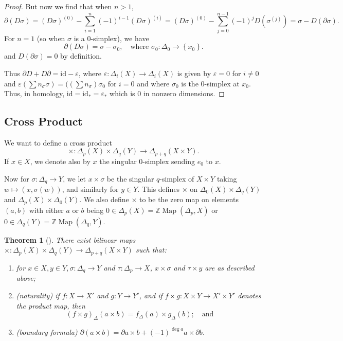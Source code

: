 \documentclass[reqno]{amsart}
\newtheorem{theorem}{Theorem}[section]
\theoremstyle{definition}
\theoremstyle{remark}
\DeclareMathOperator{\Map}{Map}
\newcommand{\id}{{\mathrm{id}}}
\begin{document}
\begin{proof}
    But now we find that when $n>1$,
    \[
    \partial \left( D \sigma \right) =
    \left( D \sigma \right)^{(0)}-
    \sum_{i=1}^{n} (-1)^{i-1} (D\sigma)^{(i)}
    = (D \sigma)^{(0)} - 
    \sum_{j=0}^{n-1} (-1)^{j} D (\sigma^{(j)}) = 
    \sigma - D\left( \partial \sigma \right) .
    \] 
    For $n=1$ (so when $\sigma$ is a $0$-simplex), we have
    \[
    \partial \left( D \sigma \right) =
    \sigma - \sigma_0, \quad \text{where } \sigma_0
    \colon \Delta_0 \to \left\{ x_0 \right\} .
    \] 
    and $D (\partial \sigma) = 0$ by definition.

    Thus $\partial D + D \partial = \id - \varepsilon$, where
    $ \varepsilon  \colon \Delta_i (X) \to 
    \Delta_i (X)$ is given by
    $ \varepsilon = 0$ for
    $i \neq 0$ and
    $\varepsilon \left( \sum n_{\sigma} \sigma \right) =
    (\left( \sum n_{\sigma} \right) \sigma_0$ for
    $i = 0$ and where
    $\sigma_0$ is the $0$-simplex at $x_0$.
    Thus, in homology,
    $\id = \id_* = \varepsilon_*$ which is
    $0$ in nonzero dimensions.
\end{proof}

\subsection{Cross Product}

We want to define a cross product
\[
\times  \colon \Delta_p (X) \times \Delta_q (Y)
\to \Delta_{p+q} (X \times Y).
\] 
If $x \in X$, we denote also by $x$ the singular
$0$-simplex sending $e_0$ to $x$.

Now for $\sigma \colon \Delta_q \to Y$, we let
$x \times \sigma$ be the singular $q$-simplex of
$X \times Y$ taking $w \mapsto (x, \sigma(w))$, and
similarly for $y \in Y$.
This defines $\times $ on 
$\Delta_0 (X) \times \Delta_q(Y)$ and
$\Delta_p(X) \times \Delta_0(Y)$.
We also define
$\times $ to be the zero map on elements
$(a,b)$ with either $a$ or $b$ being $0 \in 
\Delta_p(X) = \mathbb{Z}\Map (\Delta_p, X)$ or
$ 0 \in \Delta_q(Y) = \mathbb{Z}
\Map (\Delta_q, Y)$.

\begin{theorem}[]\label{Thm:LXOAUJC}
    There exist bilinear maps
    $\times  \colon \Delta_p(X) \times \Delta_q (Y)
    \to \Delta_{p+q}(X \times Y)$ such that:
    \begin{enumerate}
        \item for $x \in X, y \in Y, \sigma \colon
            \Delta_q \to Y$ and
            $\tau \colon \Delta_p \to X$,
            $x \times \sigma$ and $\tau \times y$ are as
            described above;
        \item (naturality) if $f \colon X \to X'$ and
            $g \colon Y \to Y'$, and if
            $f \times g \colon X \times Y \to 
            X' \times Y'$ denotes the product map, then
            \[
                (f \times g)_{\Delta} (a \times b)
                = f_{\Delta} (a) \times g_{\Delta}(b); \quad
                \text{and}
            \] 
        \item (boundary formula) $\partial (a \times b) =
            \partial a \times b + (-1)^{\deg a} a \times \partial b$.
    \end{enumerate}
\end{theorem}
\end{document}
